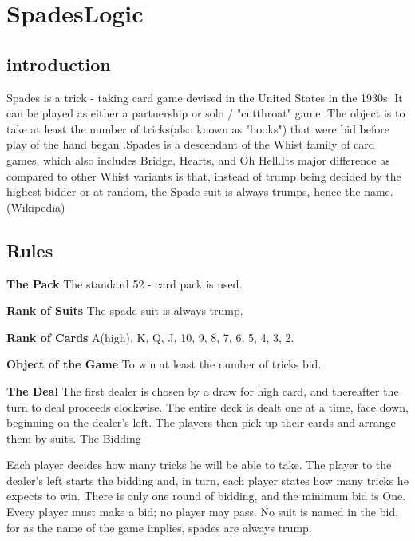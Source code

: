 \section
{
  SpadesLogic
}

\subsection
{
  introduction
}
Spades is a trick - taking card game devised in the United States in
                      the 1930s. It can be played as either a partnership or
  solo /
    "cutthroat" game
      .The object is to take at least the number of
      tricks(also known as "books") that were bid before play of the hand began
      .Spades is a descendant of the Whist family of card games,
  which also includes Bridge, Hearts,
  and Oh Hell.Its major difference as compared to other Whist variants is that,
  instead of trump being decided by the highest bidder or at random,
  the Spade suit is always trumps, hence the name.(Wikipedia)

\subsection
{
  Rules
}

\textbf
{
  The Pack
}
\newline The standard 52 -
  card pack is used.\newline

\textbf
{
  Rank of Suits
}
\newline The spade suit is always trump.\newline

\textbf
{
  Rank of Cards
}
\newline A(high), K, Q, J, 10, 9, 8, 7, 6, 5, 4, 3, 2.\newline

\textbf
{
  Object of the Game
}
\newline To win at least the number of tricks bid.\newline

\textbf
{
  The Deal
} \newline
The first dealer is chosen by a draw for high card, and thereafter the turn to deal proceeds clockwise. The entire deck is dealt one at a time, face down, beginning on the dealer's left. The players then pick up their cards and arrange them by suits.
The Bidding

Each player decides how many tricks he will be able to take. The player to the dealer's left starts the bidding and, in turn, each player states how many tricks he expects to win. There is only one round of bidding, and the minimum bid is One. Every player must make a bid; no player may pass. No suit is named in the bid, for as the name of the game implies, spades are always trump.\newline

